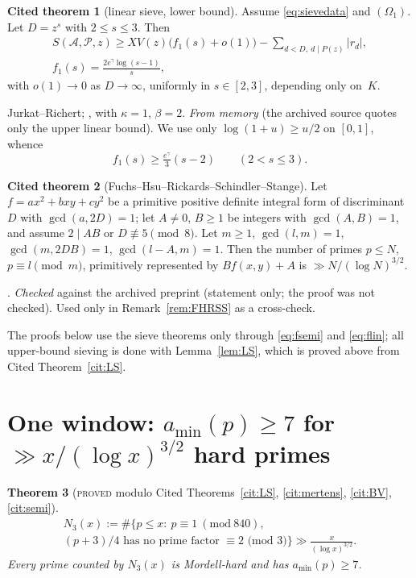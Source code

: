 \documentclass[11pt,reqno]{amsart}
\newtheorem{theorem}{Theorem}[section]
\theoremstyle{definition}
\newtheorem{citedthm}[theorem]{Cited theorem}
\newcommand{\amin}{a_{\min}}
\newcommand{\status}[1]{\textup{\textsc{#1}}}
\begin{document}
\begin{citedthm}[linear sieve, lower bound]\label{cit:lin}
Assume \eqref{eq:sievedata} and $(\Omega_1)$.  Let $D=z^s$ with $2\le s\le3$.
Then
\begin{gather*}
 S(\mathcal A,\mathcal P,z)\ge XV(z)\bigl(f_1(s)+o(1)\bigr)-\sum_{d<D,\ d\mid P(z)}|r_d|,\\
 f_1(s)=\frac{2e^\gamma\log(s-1)}{s},
\end{gather*}
with $o(1)\to0$ as $D\to\infty$, uniformly in $s\in[2,3]$, depending only on~$K$.
\end{citedthm}
\noindent Jurkat--Richert; \cite[Thm.~8.4]{HR}, \cite[Thm.~11.13]{OdC}
with $\kappa=1$, $\beta=2$.  \emph{From memory} (the archived source
\cite[(6.6)]{Ter} quotes only the upper linear bound).  We use only
$\log(1+u)\ge u/2$ on $[0,1]$, whence
\begin{equation}\label{eq:flin}
 f_1(s)\ge\tfrac{e^\gamma}3(s-2)\qquad(2<s\le3).
\end{equation}

\begin{citedthm}[Fuchs--Hsu--Rickards--Schindler--Stange]\label{cit:FHRSS}
Let $f=ax^2+bxy+cy^2$ be a primitive positive definite integral form of
discriminant $D$ with $\gcd(a,2D)=1$; let $A\ne0$, $B\ge1$ be integers with
$\gcd(A,B)=1$, and assume $2\mid AB$ or $D\not\equiv5\pmod8$.  Let $m\ge1$,
$\gcd(l,m)=1$, $\gcd(m,2DB)=1$, $\gcd(l-A,m)=1$.  Then the number of primes
$p\le N$, $p\equiv l\pmod m$, primitively represented by $Bf(x,y)+A$ is
$\gg N/(\log N)^{3/2}$.
\end{citedthm}
\noindent \cite[Thm.~1.1(2)]{FHRSS}.  \emph{Checked} against the
archived preprint (statement only; the proof was not checked).  Used only
in Remark~\ref{rem:FHRSS} as a cross-check.

The proofs below use the sieve theorems only through
\eqref{eq:fsemi} and \eqref{eq:flin}; all upper-bound sieving is done with
Lemma~\ref{lem:LS}, which is proved above from Cited
Theorem~\ref{cit:LS}.

\section{\texorpdfstring{One window: $\amin(p)\ge7$ for $\gg x/(\log x)^{3/2}$ hard primes}{One window}}\label{sec:W1}

\begin{theorem}[\status{proved} modulo Cited Theorems~\ref{cit:LS}, \ref{cit:mertens}, \ref{cit:BV}, \ref{cit:semi}]\label{thm:W1}
\begin{multline*}
 N_3(x):=\#\{p\le x:\ p\equiv1\ (\mathrm{mod}\ 840),\\
 \text{$(p+3)/4$ has no prime factor $\equiv2$ (mod 3)}\}
 \gg\frac{x}{(\log x)^{3/2}}.
\end{multline*}
Every prime counted by $N_3(x)$ is Mordell-hard and has $\amin(p)\ge7$.
\end{theorem}
\end{document}
